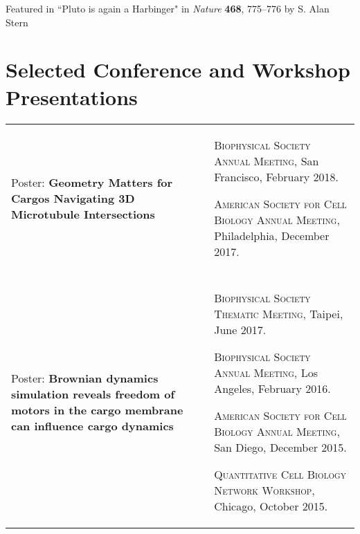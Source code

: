 \documentclass[letterpaper,10pt]{article} %
\makeatletter
\newcommand\cellwidth{\TX@col@width}
\makeatother
\begin{document}
\begin{adjustwidth}{.5cm}{}
Featured in ``Pluto is again a Harbinger" in \textit{Nature} \textbf{468}, 775--776 by S. Alan Stern
\end{adjustwidth}


\section*{Selected Conference and Workshop Presentations}

\begin{tabularx}{\textwidth}{p{} | X}
\begin{minipage}{.4\textwidth}
Poster: \textbf{Geometry Matters for Cargos Navigating 3D Microtubule Intersections}
\end{minipage}
&
\begin{minipage}{\cellwidth}
\begin{description}[itemsep=.25ex,labelsep=0em]
\item \textsc{Biophysical Society Annual Meeting}, San Francisco, February 2018.
\item \textsc{American Society for Cell Biology Annual Meeting}, Philadelphia, December 2017.
\end{description}
\end{minipage} \\

\multicolumn{2}{c}{} \\

\begin{minipage}{.4\textwidth}
Poster: \textbf{Brownian dynamics simulation reveals freedom of motors in the cargo membrane can influence cargo dynamics}
\end{minipage}
&
\begin{minipage}{\cellwidth}
\begin{description}[itemsep=.25ex,labelsep=0em]
\item \textsc{Biophysical Society Thematic Meeting}, Taipei, June 2017.
\item \textsc{Biophysical Society Annual Meeting}, Los Angeles, February 2016.
\item \textsc{American Society for Cell Biology Annual Meeting}, San Diego, December 2015.
\item \textsc{Quantitative Cell Biology Network Workshop}, Chicago, October 2015.
\end{description}
\end{minipage} \\


\end{tabularx}
\end{document}
